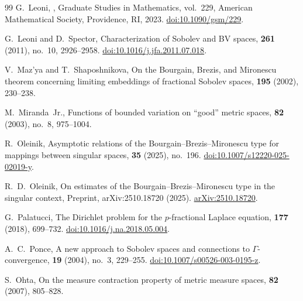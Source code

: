 \documentclass[reqno,11pt]{amsart}
\numberwithin{equation}{section}
\theoremstyle{definition} %
\theoremstyle{plain}
\theoremstyle{definition}
\theoremstyle{remark}
\begin{document}
\begin{thebibliography}{99}
G.~Leoni,
,
\newblock Graduate Studies in Mathematics, vol.~229, American Mathematical Society, Providence, RI, 2023.
\newblock \href{https://doi.org/10.1090/gsm/229}{doi:10.1090/gsm/229}.

G.~Leoni and D.~Spector,
\newblock Characterization of {S}obolev and {BV} spaces,
 \textbf{261} (2011), no.~10, 2926--2958.
\newblock \href{https://doi.org/10.1016/j.jfa.2011.07.018}{doi:10.1016/j.jfa.2011.07.018}.

V.~Maz'ya and T.~Shaposhnikova,
\newblock On the {B}ourgain, {B}rezis, and {M}ironescu theorem concerning limiting embeddings of fractional {S}obolev spaces,
 \textbf{195} (2002), 230--238.

M.~Miranda~Jr.,
\newblock Functions of bounded variation on ``good'' metric spaces,
 \textbf{82} (2003), no.~8, 975--1004.

R.~Oleinik,
\newblock Asymptotic relations of the {B}ourgain--{B}rezis--{M}ironescu type for mappings between singular spaces,
 \textbf{35} (2025), no.~196.
\newblock \href{https://doi.org/10.1007/s12220-025-02019-y}{doi:10.1007/s12220-025-02019-y}.


R.~D.~Oleinik,
\newblock On estimates of the {B}ourgain--{B}rezis--{M}ironescu type in the singular context,
\newblock Preprint, arXiv:2510.18720 (2025).
\newblock \href{https://arxiv.org/abs/2510.18720}{arXiv:2510.18720}.

G.~Palatucci,
\newblock The {D}irichlet problem for the $p$-fractional {L}aplace equation,
 \textbf{177} (2018), 699--732.
\newblock \href{https://doi.org/10.1016/j.na.2018.05.004}{doi:10.1016/j.na.2018.05.004}.

A.~C.~Ponce,
\newblock A new approach to {S}obolev spaces and connections to $\Gamma$-convergence,
 \textbf{19} (2004), no.~3, 229--255.
\newblock \href{https://doi.org/10.1007/s00526-003-0195-z}{doi:10.1007/s00526-003-0195-z}.

S.~Ohta,
\newblock On the measure contraction property of metric measure spaces,
 \textbf{82} (2007), 805--828.


\end{thebibliography}
\end{document}
